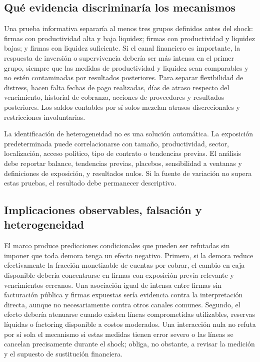 \documentclass[11pt,a4paper]{article}
\begin{document}
\subsection{Qué evidencia discriminaría los mecanismos}
Una prueba informativa separaría al menos tres grupos definidos antes del shock: firmas con productividad alta y baja liquidez; firmas con productividad y liquidez bajas; y firmas con liquidez suficiente. Si el canal financiero es importante, la respuesta de inversión o supervivencia debería ser más intensa en el primer grupo, siempre que las medidas de productividad y liquidez sean comparables y no estén contaminadas por resultados posteriores. Para separar flexibilidad de distress, hacen falta fechas de pago realizadas, días de atraso respecto del vencimiento, historial de cobranza, acciones de proveedores y resultados posteriores. Los saldos contables por sí solos mezclan atrasos discrecionales y restricciones involuntarias.

La identificación de heterogeneidad no es una solución automática. La exposición predeterminada puede correlacionarse con tamaño, productividad, sector, localización, acceso político, tipo de contrato o tendencias previas. El análisis debe reportar balance, tendencias previas, placebos, sensibilidad a ventanas y definiciones de exposición, y resultados nulos. Si la fuente de variación no supera estas pruebas, el resultado debe permanecer descriptivo.

\subsection{Implicaciones observables, falsación y heterogeneidad}
El marco produce predicciones condicionales que pueden ser refutadas sin imponer que toda demora tenga un efecto negativo. Primero, si la demora reduce efectivamente la fracción monetizable de cuentas por cobrar, el cambio en caja disponible debería concentrarse en firmas con exposición previa relevante y vencimientos cercanos. Una asociación igual de intensa entre firmas sin facturación pública y firmas expuestas sería evidencia contra la interpretación directa, aunque no necesariamente contra otros canales comunes. Segundo, el efecto debería atenuarse cuando existen líneas comprometidas utilizables, reservas líquidas o factoring disponible a costos moderados. Una interacción nula no refuta por sí sola el mecanismo si estas medidas tienen error severo o las líneas se cancelan precisamente durante el shock; obliga, no obstante, a revisar la medición y el supuesto de sustitución financiera.
\end{document}
